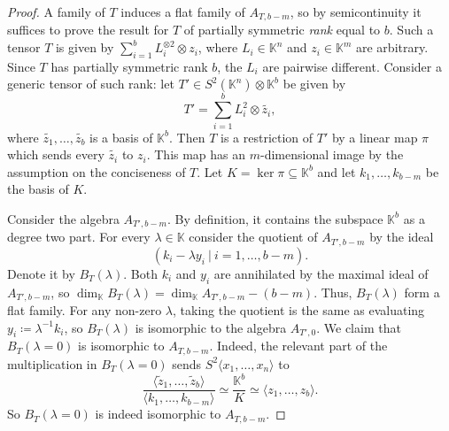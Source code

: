 \documentclass[a4paper,11pt,reqno]{amsart}
\newcommand{\bbK}{\mathbb{K}}
\newcommand{\oldtext}[1]{\textcolor{darkelectricblue}{#1}}
\newcommand{\cfchange}[1]{\textcolor{blue}{#1}}
\numberwithin{equation}{section}
\theoremstyle{definition}
\theoremstyle{plain}
\theoremstyle{remark}
\begin{document}
\begin{proof}
    \def\Balg#1{B_{T}(#1)}

    A family of $T$ induces a flat family of $A_{T, b-m}$, so by semicontinuity
    it {suffices} to prove the result for $T$ of partially symmetric
    \emph{rank} equal to $b$. Such a tensor $T$ is given by $\sum_{i=1}^b
    L_i^{\otimes 2}\otimes z_i$, where $L_i\in \bbK^n$ and $z_i\in
    \bbK^m$ are arbitrary. {Since} $T$ has partially symmetric rank $b$, the $L_i$ are
    pairwise different.
    Consider a generic tensor of such rank: let
    $T'\in S^2(\bbK^n) \otimes \bbK^b$ be given by
    \[
        T' = \sum_{i=1}^b L_i^2\otimes \widetilde{z_i},
    \]
    where $\widetilde{z_1}, \ldots ,\widetilde{z_b}$ is a basis of $\bbK^b$.
    Then $T$ is a restriction of $T'$ by a linear map $\pi$ {which} sends every
    $\widetilde{z_i}$ to $z_i$. This map {has an} $m$-dimensional image by
    {the assumption} on the conciseness of $T$. Let $K = \ker \pi\subseteq
    \bbK^b$ and let $k_1, \ldots ,k_{b-m}$ be the basis of $K$.

    Consider the algebra $A_{T',b-m}$. {By definition, it contains the subspace $\bbK^b$ as a degree two part.}
    For every $\lambda\in \bbK$ consider the quotient
    of $A_{T', b-m}$ by the ideal
    \[
        \left( k_i - \lambda y_i\ |\ i=1, \ldots ,b-m \right).
    \]
    Denote it by $\Balg{\lambda}$.
    Both $k_i$ and $y_i$ are annihilated by the maximal ideal of $A_{T',
    b-m}$, so $\dim_{\bbK} \Balg{\lambda} = \dim_{\bbK} A_{T', b-m} - (b-m)$. Thus, $\Balg{\lambda}$ form a
    flat family. For {any non-zero $\lambda$,} taking
    the quotient is the same as evaluating $y_i \coloneqq \lambda^{-1}k_i$, so
    $\Balg{\lambda}$ is isomorphic to the algebra $A_{T', 0}$.
    We claim that $\Balg{\lambda= 0}$ is
    isomorphic to $A_{T, b-m}$. Indeed, the
    relevant part of the multiplication in $\Balg{\lambda=0}$ sends $S^2\langle x_1, \ldots
    ,x_n\rangle$ to
    {\[
        \frac{\langle \widetilde{z}_1, \ldots ,\widetilde{z}_b \rangle}{\langle k_1, \ldots ,
            k_{b-m}\rangle} \simeq \frac{\bbK^b}{K} \simeq \langle z_1, \ldots
            ,z_b\rangle.
    \]
    So $\Balg{\lambda=0}$ is indeed isomorphic to $A_{T, b-m}$.}



\end{proof}
\end{document}
